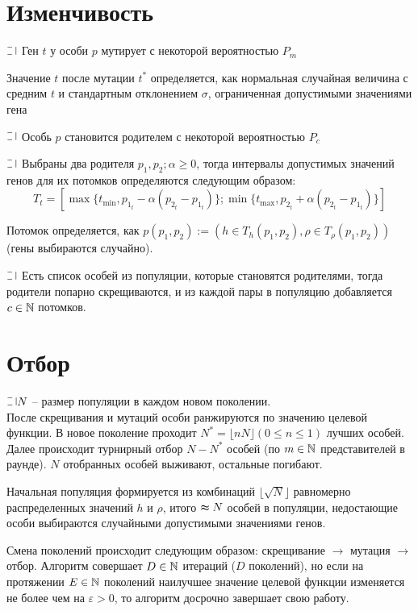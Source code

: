 \section{Изменчивость}
$\letus$ Ген $t$ у особи $p$ мутирует с некоторой вероятностью $P_m$
\begin{definition} Значение $t$ после мутации $t^*$ определяется, как нормальная случайная величина с средним $t$ и стандартным отклонением $\sigma$, ограниченная допустимыми значениями гена
\end{definition}

$\letus$ Особь $p$ становится родителем с некоторой вероятностью $P_c$
\begin{definition}
    $\letus$ Выбраны два родителя $p_1, p_2; \alpha \ge 0$, тогда интервалы допустимых значений генов для их потомков определяются следующим образом:
    {\large \[
    T_t = [\max\{t_{\min}, p_{1_{t}} - \alpha(p_{2_{t}} - p_{1_{t}})\}; \min\{t_{\max}, p_{2_{t}} + \alpha(p_{2_{t}} - p_{1_{t}})\}]
    \]}
\end{definition}
\begin{definition}
    Потомок определяется, как $p(p_1, p_2) := (h \in T_h(p_1, p_2), \rho \in T_{\rho}(p_1, p_2))$ (гены выбираются случайно).
\end{definition}
\begin{algo}
$\letus$ Есть список особей из популяции, которые становятся родителями, тогда
родители попарно скрещиваются, и из каждой пары в популяцию добавляется $c \in \mathbb{N}$ потомков.    
\end{algo}
\section{Отбор}
$\letus N$ -- размер популяции в каждом новом поколении.\\ 
После скрещивания и мутаций особи ранжируются по значению целевой функции. 
В новое поколение проходит $N^* = \lfloor nN \rfloor (0 \le n \le 1)$ лучших особей. 
Далее происходит турнирный отбор $N - N^*$ особей (по $m \in \mathbb{N}$ представителей в раунде). $N$ отобранных особей выживают, остальные погибают.

Начальная популяция формируется из комбинаций $\lfloor \sqrt{N} \rfloor$ равномерно распределенных значений $h$ и $\rho$, итого $\thickapprox N$ особей в популяции, недостающие особи выбираются случайными допустимыми значениями генов.

Смена поколений происходит следующим образом: скрещивание $\rightarrow$ мутация $\rightarrow$ отбор.
Алгоритм совершает $D \in \mathbb{N}$ итераций ($D$ поколений), но если на протяжении $E \in \mathbb{N}$ поколений наилучшее значение целевой функции изменяется не более чем на $\varepsilon > 0$, то алгоритм досрочно завершает свою работу.
